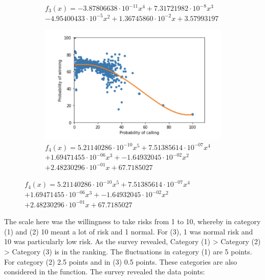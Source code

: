 \begin{figure}[ht]
\begin{subfigure}{0.5\textwidth}
    \caption{$f_3(x)=-3.87806638\cdot 10^{-11}x^4+7.31721982\cdot 10^{-8}x^3$ \\$ -4.95400433\cdot 10^{-5}x^2+ 1.36745860 \cdot 10^{-2}x+3.57993197$}
    \label{fig:12}
\end{subfigure}
\begin{subfigure}{0.5\textwidth}
    \centering
    \includegraphics[width=1\linewidth]{Bilder/calling_winning_graph}
    \caption{$f_4(x)=5.21140286\cdot 10^{-10}x^5+  7.51385614\cdot 10^{-07}x^4$ \\$+  1.69471455\cdot 10^{-06}x^3+ -1.64932045\cdot 10^{-02}x^2$\\$+2.48230296\cdot 10^{-01}x + 67.7185027$}
    \label{fig:13}
\end{subfigure}
\end{figure}
The scale here was the willingness to take risks from 1 to 10, whereby in category (1) and (2) 10 meant a lot of risk and 1 normal. For (3), 1 was normal risk and 10 was particularly low risk.
 As the survey revealed, Category (1) > Category (2) > Category (3) is in the ranking. The fluctuations in category (1) are 5 points.
 For category (2) 2.5 points and in (3) 0.5 points. These categories are also considered in the function.
The survey revealed the data points: \\
